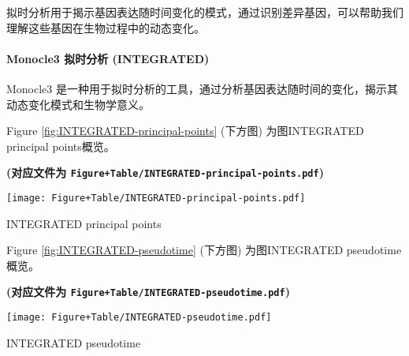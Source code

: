 \documentclass[
]{article}
\begin{document}
拟时分析用于揭示基因表达随时间变化的模式，通过识别差异基因，可以帮助我们理解这些基因在生物过程中的动态变化。

\hypertarget{monocle3-ux62dfux65f6ux5206ux6790-integrated}{%
\paragraph{Monocle3 拟时分析 (INTEGRATED)}\label{monocle3-ux62dfux65f6ux5206ux6790-integrated}}

Monocle3 是一种用于拟时分析的工具，通过分析基因表达随时间的变化，揭示其动态变化模式和生物学意义。

\begin{center}\vspace{1.5cm}\end{center}

Figure \ref{fig:INTEGRATED-principal-points} (下方图) 为图INTEGRATED principal points概览。

\textbf{(对应文件为 \texttt{Figure+Table/INTEGRATED-principal-points.pdf})}

\def\@captype{figure}
\begin{center}
\texttt{[image: Figure+Table/INTEGRATED-principal-points.pdf]}
\caption{INTEGRATED principal points}\label{fig:INTEGRATED-principal-points}
\end{center}

\begin{center}\vspace{1.5cm}\end{center}

\begin{center}\vspace{1.5cm}\end{center}

Figure \ref{fig:INTEGRATED-pseudotime} (下方图) 为图INTEGRATED pseudotime概览。

\textbf{(对应文件为 \texttt{Figure+Table/INTEGRATED-pseudotime.pdf})}

\def\@captype{figure}
\begin{center}
\texttt{[image: Figure+Table/INTEGRATED-pseudotime.pdf]}
\caption{INTEGRATED pseudotime}\label{fig:INTEGRATED-pseudotime}
\end{center}

\begin{center}\vspace{1.5cm}\end{center}
\end{document}
